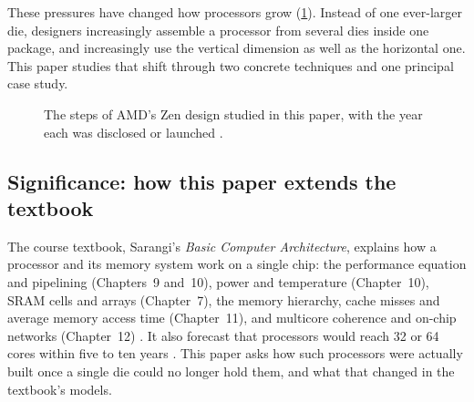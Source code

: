These pressures have changed how processors grow (\cref{fig:zen-timeline}). Instead of one ever-larger die, designers increasingly assemble a processor from several dies inside one package, and increasingly use the vertical dimension as well as the horizontal one. This paper studies that shift through two concrete techniques and one principal case study.

\begin{figure}[htbp]
\centering
{}
\caption[The steps of AMD's Zen design studied in this paper]{The steps of AMD's Zen design studied in this paper, with the year each was disclosed or launched \cite{suggs2019zen2,naffziger2020chiplet,advancedmicrodevicesinc.AMDLaunchesAMD2020,swaminathanAdvancedPackagingEnabling2021,wuu2022vcache,larabelAMDEPYC7773X2022,alam2ndGeneration3D2024,advancedmicrodevicesinc.4thGenAMD2023,advancedmicrodevicesinc.GamingLegendContinues2024}.}
\label{fig:zen-timeline}
\end{figure}

\subsection{Significance: how this paper extends the textbook}
\label{sec:significance}
The course textbook, Sarangi's \emph{Basic Computer Architecture}, explains how a processor and its memory system work on a single chip: the performance equation and pipelining (Chapters~9 and~10), power and temperature (Chapter~10), SRAM cells and arrays (Chapter~7), the memory hierarchy, cache misses and average memory access time (Chapter~11), and multicore coherence and on-chip networks (Chapter~12) \cite{sarangi2025basic}. It also forecast that processors would reach 32 or 64 cores within five to ten years \cite[sec.~12.1.2]{sarangi2025basic}. This paper asks how such processors were actually built once a single die could no longer hold them, and what that changed in the textbook's models.

